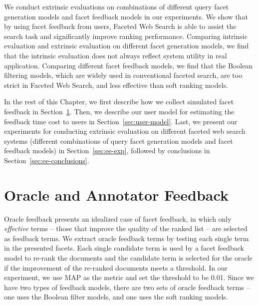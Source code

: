 We conduct extrinsic evaluations on combinations of different query facet generation models and facet feedback models in our experiments. We show that by using facet feedback from users, Faceted Web Search is able to assist the search task and significantly improve ranking performance.
Comparing intrinsic evaluation and extrinsic evaluation on different facet generation models, we find that the intrinsic evaluation does not always reflect system utility in real application. Comparing different facet feedback models, we find that the Boolean filtering models, which are widely used in conventional faceted search, are too strict in Faceted Web Search, and less effective than soft ranking models.

In the rest of this Chapter, we first describe how we collect simulated facet feedback in Section~\ref{sec:oa-feedback}. Then, we describe our user model for estimating the feedback time cost to users in Section~\ref{sec:user-model}. Last, we present our experiments for conducting extrinsic evaluation on different faceted web search systems (different combinations of query facet generation models and facet feedback models) in Section~\ref{sec:ee-exp}, followed by conclusions in Section~\ref{sec:ee-conclusions}. 


\section{Oracle and Annotator Feedback} \label{sec:oa-feedback}
Oracle feedback presents an idealized case of facet feedback, in which only \emph{effective} terms -- those that improve the quality of the ranked list -- are selected as feedback terms. We extract oracle feedback terms by testing each single term in the presented facets. Each single candidate term is used by a facet feedback model to re-rank the documents and the candidate term is selected for the oracle if the improvement of the re-ranked documents meets a threshold. In our experiment, we use MAP as the metric and set the threshold to be 0.01. Since we have two types of feedback models, there are two sets of oracle feedback terms --  one uses the Boolean filter models, and one uses the soft ranking models.

